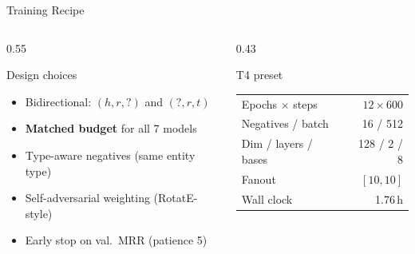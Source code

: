 \documentclass[aspectratio=43,11pt]{beamer}
\begin{document}
\begin{frame}{Training Recipe}
  \begin{columns}[T]
    \begin{column}{0.55\textwidth}
      \begin{block}{Design choices}
        \begin{itemize}
          \item Bidirectional: $(h,r,?)$ and $(?,r,t)$
          \item \textbf{Matched budget} for all 7 models
          \item Type-aware negatives (same entity type)
          \item Self-adversarial weighting (RotatE-style)
          \item Early stop on val.\ MRR (patience 5)
        \end{itemize}
      \end{block}
    \end{column}
    \begin{column}{0.43\textwidth}
      \begin{block}{T4 preset}
        \begin{tabular}{lr}
          Epochs $\times$ steps & $12\times 600$ \\
          Negatives / batch & 16 / 512 \\
          Dim / layers / bases & 128 / 2 / 8 \\
          Fanout & $[10,10]$ \\
          Wall clock & 1.76\,h \\
        \end{tabular}
      \end{block}
    \end{column}
  \end{columns}
\end{frame}
\end{document}

